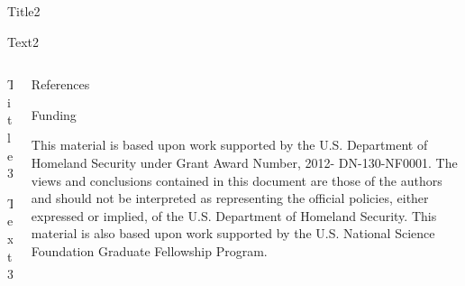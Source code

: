 \documentclass{beamer}
\begin{document}
\begin{frame}[t]{}
\begin{columns}
\begin{column}[T]{0.72\textwidth}
\begin{columns}[t]
\begin{column}{0.24\textwidth}
\begin{block}{Title2}

Text2

\end{block}
\end{column}
\end{columns}

\begin{columns}[t]
\begin{column}{0.6\textwidth}
\begin{block}{Title3}

Text3

\end{block}
\end{column}

\begin{column}{0.4\textwidth}
\begin{block}{\large References}
\printbibliography
\end{block}

\begin{block}{\large Funding}

This material is based upon work supported by the U.S. Department of Homeland
Security under Grant Award Number, 2012- DN-130-NF0001. The views and
conclusions contained in this document are those of the authors and should not
be interpreted as representing the official policies, either expressed or
implied, of the U.S. Department of Homeland Security. This material is also
based upon work supported by the U.S. National Science Foundation Graduate
Fellowship Program.


\end{block}
\end{column}
\end{columns}
\end{column}
\end{columns}
\end{frame}
\end{document}
